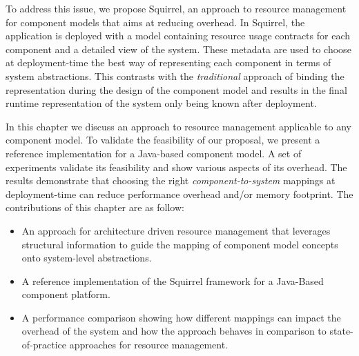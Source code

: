 
To address this issue, we propose Squirrel, an approach to resource management for component models that aims at reducing overhead.
In Squirrel, the application is deployed with a model containing resource usage contracts for each component and a detailed view of the system.
These metadata are used to choose at deployment-time the best way of representing each component in terms of system abstractions.
This contrasts with the \textit{traditional} approach of binding the representation during the design of the component model and results in the final runtime representation of the system only being known after deployment.




In this chapter we discuss an approach to resource management applicable to any component model. To validate the feasibility of our proposal, we present a reference implementation for a Java-based component model.
A set of experiments validate its feasibility and show various aspects of its overhead.
The results demonstrate that choosing the right \textit{component-to-system} mappings at deployment-time can reduce performance overhead and/or memory footprint.
The contributions of this chapter are as follow:
\begin{itemize}
\item An approach for architecture driven resource management that leverages structural information to guide the mapping of component model concepts onto system-level abstractions.
\item A reference implementation of the Squirrel framework for a Java-Based component platform.
\item A performance comparison showing how different mappings can impact the overhead of the system and how the approach behaves in comparison to state-of-practice approaches for resource management.
\end{itemize}

